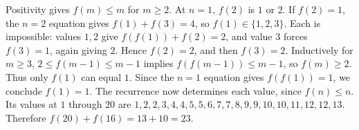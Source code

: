 Positivity gives $f(m)\le m$ for $m\ge2$. At $n=1$, $f(2)$ is $1$ or $2$. If $f(2)=1$, the $n=2$ equation gives $f(1)+f(3)=4$, so $f(1)\in\{1,2,3\}$. Each is impossible: values $1,2$ give $f(f(1))+f(2)=2$, and value $3$ forces $f(3)=1$, again giving $2$. Hence $f(2)=2$, and then $f(3)=2$. Inductively for $m\ge3$, $2\le f(m-1)\le m-1$ implies $f(f(m-1))\le m-1$, so $f(m)\ge2$. Thus only $f(1)$ can equal $1$. Since the $n=1$ equation gives $f(f(1))=1$, we conclude $f(1)=1$. The recurrence now determines each value, since $f(n)\le n$. Its values at $1$ through $20$ are $1,2,2,3,4,4,5,5,6,7,7,8,9,9,10,10,11,12,12,13$. Therefore $\boxed{f(20)+f(16)=13+10=23}$.
